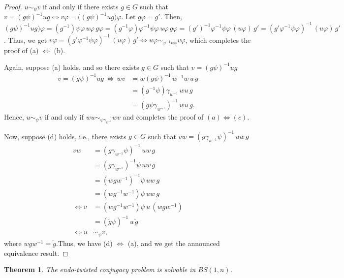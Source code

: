 \documentclass[a4paper]{amsart}
\newtheorem{thm}{Theorem}[section]
\theoremstyle{definition}
\begin{document}
\begin{proof}
    $u \sim_\psi v$ if and only if there exists $g \in G$ such that $v = (g\psi)^{-1} u g \Leftrightarrow v \varphi = \big( (g\psi)^{-1} u g\big) \varphi$. Let $g \varphi = g'$. Then, $(g\psi)^{-1} u g\big) \varphi = (g^{-1})\psi\varphi \, u\varphi \, g\varphi = (g^{-1}\varphi)\varphi^{-1}\psi\varphi \, u\varphi \, g\varphi = (g')^{-1}\varphi^{-1}\psi\varphi \, (u\varphi) \, g' = (g' \varphi^{-1}\psi\varphi)^{-1} \, (u\varphi) \, g'$. Thus, we get $v\varphi = (g' \varphi^{-1}\psi\varphi)^{-1} \, (u\varphi) \, g' \Leftrightarrow u\varphi \sim_{\varphi^{-1}\psi\varphi} v\varphi$, which completes the proof of (a) $\Leftrightarrow$ (b).

    Again, suppose (a) holds, and so there exists $g \in G$ such that $v = (g\psi)^{-1} u g$
\begin{align*}
v = (g\psi)^{-1} u g \, \Leftrightarrow \, wv &= w(g\psi)^{-1} \, w^{-1} w \, u \, g \\ & = (g^{-1}\psi) \gamma_{w^{-1}} \, wu \, g \\ & = (g \psi \gamma_{w^{-1}})^{-1} \, wu \, g.
 \end{align*}
%
Hence, $u \sim_\psi v$ if and only if $wu \sim_{\psi \gamma_{w^{-1}}} wv$ and completes the proof of $(a) \Leftrightarrow (c)$.

Now, suppose (d) holds, i.e., there exists $g \in G$ such that $vw = (g\gamma_{w^{-1}} \psi)^{-1} \, uw \, g$
\begin{align*}
vw & = (g\gamma_{w^{-1}} \psi)^{-1} \, uw\, g\\ & = (g\gamma_{w^{-1}})^{-1} \psi \, uw \, g \\ & = (w g w^{-1})^{-1} \psi \, uw \, g \\&= (w g^{-1} w^{-1})\psi \, uw \,g \\ \Leftrightarrow v & = (w g^{-1} w^{-1})\psi \, u \, (w g w^{-1}) \\ &= (\tilde{g}\psi)^{-1} \, u \, \tilde{g} \\ \Leftrightarrow u &\sim_{\psi} v,
 \end{align*}
%
where $wgw^{-1} = \tilde{g}$.Thus, we have (d) $\Leftrightarrow$ (a), and we get the announced equivalence result. 
\end{proof}

\begin{thm}\label{thm: main TCP}
The endo-twisted conjugacy problem is solvable in $BS(1,n)$.
\end{thm}
\end{document}
